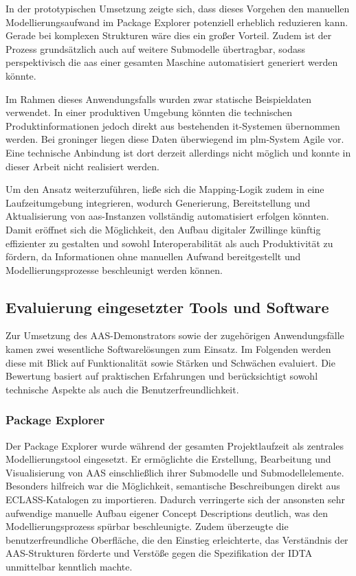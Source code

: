 In der prototypischen Umsetzung zeigte sich, dass dieses Vorgehen den manuellen Modellierungsaufwand im Package Explorer potenziell erheblich reduzieren kann.
Gerade bei komplexen Strukturen wäre dies ein großer Vorteil. 
Zudem ist der Prozess grundsätzlich auch auf weitere Submodelle übertragbar, sodass perspektivisch die \acs{aas} einer gesamten Maschine automatisiert generiert werden könnte. 

Im Rahmen dieses Anwendungsfalls wurden zwar statische Beispieldaten verwendet. 
In einer produktiven Umgebung könnten die technischen Produktinformationen jedoch direkt aus bestehenden \acs{it}-Systemen übernommen werden. 
Bei groninger liegen diese Daten überwiegend im \acs{plm}-System Agile vor. 
Eine technische Anbindung ist dort derzeit allerdings nicht möglich und konnte in dieser Arbeit nicht realisiert werden.

Um den Ansatz weiterzuführen, ließe sich die Mapping-Logik zudem in eine Laufzeitumgebung integrieren, wodurch Generierung, Bereitstellung und Aktualisierung von \acs{aas}-Instanzen vollständig automatisiert erfolgen könnten. 
Damit eröffnet sich die Möglichkeit, den Aufbau digitaler Zwillinge künftig effizienter zu gestalten und sowohl Interoperabilität als auch Produktivität zu fördern, da Informationen ohne manuellen Aufwand bereitgestellt und Modellierungsprozesse beschleunigt werden können.

\newpage
\subsection{Evaluierung eingesetzter Tools und Software}
\label{subsec:EvaluierungTools}
Zur Umsetzung des AAS-Demonstrators sowie der zugehörigen Anwendungsfälle kamen zwei wesentliche Softwarelösungen zum Einsatz.
Im Folgenden werden diese mit Blick auf Funktionalität sowie Stärken und Schwächen evaluiert.
Die Bewertung basiert auf praktischen Erfahrungen und berücksichtigt sowohl technische Aspekte als auch die Benutzerfreundlichkeit.

\subsubsection{Package Explorer}

Der Package Explorer wurde während der gesamten Projektlaufzeit als zentrales Modellierungstool eingesetzt.
Er ermöglichte die Erstellung, Bearbeitung und Visualisierung von AAS einschließlich ihrer Submodelle und Submodellelemente.
Besonders hilfreich war die Möglichkeit, semantische Beschreibungen direkt aus ECLASS-Katalogen zu importieren.
Dadurch verringerte sich der ansonsten sehr aufwendige manuelle Aufbau eigener Concept Descriptions deutlich, was den Modellierungsprozess spürbar beschleunigte.
Zudem überzeugte die benutzerfreundliche Oberfläche, die den Einstieg erleichterte, das Verständnis der AAS-Strukturen förderte und Verstöße gegen die Spezifikation der IDTA unmittelbar kenntlich machte.

